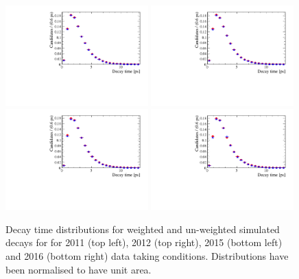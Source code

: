 \begin{figure}[htbp]
  \centering
    \includegraphics[width=0.49\textwidth]{./Figs/LifetimeMeasurement/2011_DT_Bs2MuMu.pdf}
    \includegraphics[width=0.49\textwidth]{./Figs/LifetimeMeasurement/2012_DT_Bs2MuMu.pdf}
    \includegraphics[width=0.49\textwidth]{./Figs/LifetimeMeasurement/2015_DT_Bs2MuMu.pdf}
    \includegraphics[width=0.49\textwidth]{./Figs/LifetimeMeasurement/2016_DT_Bs2MuMu.pdf}
  \caption{Decay time distributions for weighted and un-weighted \bsmumu simulated decays for for 2011 (top left), 2012 (top right), 2015 (bottom left) and 2016 (bottom right) data taking conditions. Distributions have been normalised to have unit area.}
  \label{fig:BsmmDT}
\end{figure}

